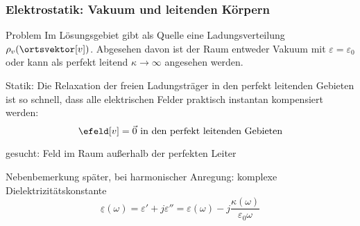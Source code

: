    \begin{frame}
  \frametitle{Elektrostatik: Vakuum und leitenden Körpern}

                \begin{block}{Problem}
    Im Lösungsgebiet gibt als Quelle eine Ladungsverteilung
    $\rho_v(\ortsvektor[v])$. Abgesehen davon ist der Raum entweder Vakuum
    mit $\varepsilon=\varepsilon_0$ oder kann als perfekt leitend
    $\kappa \to\infty$ angesehen
    werden.

    \alert{Statik:} Die Relaxation der freien Ladungsträger in den perfekt
    leitenden Gebieten ist so schnell, dass alle elektrischen Felder
    praktisch instantan kompensiert werden:
    $$
    \efeld[v] = \vec{0} \text{ in den perfekt leitenden Gebieten}
    $$

    \alert{gesucht:} Feld im Raum außerhalb der perfekten Leiter
  \end{block}
  \begin{block}{Nebenbemerkung}
    \alert{später, bei harmonischer Anregung:} komplexe
    Dielektrizitätskonstante
    $$
    \underline{\varepsilon}(\omega) = \varepsilon'+j\varepsilon'' =\varepsilon(\omega) - j \frac{\kappa(\omega)}{\varepsilon_0\omega}
    $$
    \end{block}

  \end{frame}
\begin{frame}

  
\end{frame}

